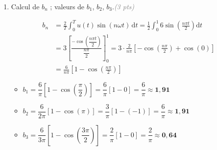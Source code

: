 \documentclass[a4paper,11pt]{article}
\newcommand{\dt}{\mathrm{d}t}
\newcommand{\reponse}[1]{%
  \begin{tcolorbox}[corrbox={}]
    #1
  \end{tcolorbox}%
}
\newcommand{\pts}[1]{\hfill\textcolor{gray}{\small\textit{(#1 pts)}}}
\begin{document}
\begin{enumerate}[label=\textbf{\arabic*.}, leftmargin=*, itemsep=0.4cm]
  \item Calcul de $b_n$ ; valeurs de $b_1$, $b_2$, $b_3$.\pts{3}

  \reponse{
    \begin{align*}
      b_n &= \frac{2}{T}\int_0^{T} u(t)\sin(n\omega t)\,\dt
           = \frac{1}{2}\int_0^{1} 6\sin\!\left(\frac{n\pi t}{2}\right)\dt \\[4pt]
          &= 3\left[\frac{-\cos\!\left(\dfrac{n\pi t}{2}\right)}{\dfrac{n\pi}{2}}\right]_0^{1}
           = 3\cdot\frac{2}{n\pi}\left[-\cos\!\left(\frac{n\pi}{2}\right)+\cos(0)\right] \\[6pt]
          &= \boxed{\frac{6}{n\pi}\left[1-\cos\!\left(\frac{n\pi}{2}\right)\right]}
    \end{align*}

    \medskip
    \begin{itemize}[leftmargin=1.5em, itemsep=2pt]
      \item $b_1 = \dfrac{6}{\pi}\left[1-\cos\!\left(\dfrac{\pi}{2}\right)\right]
                = \dfrac{6}{\pi}\left[1-0\right] = \dfrac{6}{\pi} \approx \mathbf{1{,}91}$

      \item $b_2 = \dfrac{6}{2\pi}\left[1-\cos(\pi)\right]
                = \dfrac{3}{\pi}\left[1-(-1)\right] = \dfrac{6}{\pi} \approx \mathbf{1{,}91}$

      \item $b_3 = \dfrac{6}{3\pi}\left[1-\cos\!\left(\dfrac{3\pi}{2}\right)\right]
                = \dfrac{2}{\pi}\left[1-0\right] = \dfrac{2}{\pi} \approx \mathbf{0{,}64}$
    \end{itemize}
  }

\end{enumerate}
\end{document}
